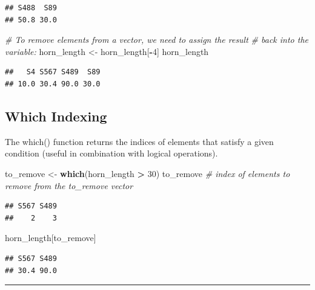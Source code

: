 \documentclass[
]{book}
\newenvironment{Shaded}{\begin{snugshade}}{\end{snugshade}}
\newcommand{\CommentTok}[1]{\textcolor[rgb]{0.56,0.35,0.01}{\textit{#1}}}
\newcommand{\DecValTok}[1]{\textcolor[rgb]{0.00,0.00,0.81}{#1}}
\newcommand{\FunctionTok}[1]{\textcolor[rgb]{0.13,0.29,0.53}{\textbf{#1}}}
\newcommand{\NormalTok}[1]{#1}
\newcommand{\OtherTok}[1]{\textcolor[rgb]{0.56,0.35,0.01}{#1}}
\newcommand{\SpecialCharTok}[1]{\textcolor[rgb]{0.81,0.36,0.00}{\textbf{#1}}}
\begin{document}
\begin{verbatim}
## S488  S89 
## 50.8 30.0
\end{verbatim}

\begin{Shaded}
\begin{Highlighting}[]
\CommentTok{\# To remove elements from a vector, we need to assign the result }
\CommentTok{\# back into the variable:}
\NormalTok{horn\_length }\OtherTok{\textless{}{-}}\NormalTok{ horn\_length[}\SpecialCharTok{{-}}\DecValTok{4}\NormalTok{]}
\NormalTok{horn\_length}
\end{Highlighting}
\end{Shaded}

\begin{verbatim}
##   S4 S567 S489  S89 
## 10.0 30.4 90.0 30.0
\end{verbatim}

\subsection{Which Indexing}\label{which-indexing}

The which() function returns the indices of elements that satisfy a given condition (useful in combination with logical operations).

\begin{Shaded}
\begin{Highlighting}[]
\NormalTok{to\_remove }\OtherTok{\textless{}{-}} \FunctionTok{which}\NormalTok{(horn\_length }\SpecialCharTok{\textgreater{}} \DecValTok{30}\NormalTok{)}
\NormalTok{to\_remove }\CommentTok{\# index of elements to remove from the to\_remove vector}
\end{Highlighting}
\end{Shaded}

\begin{verbatim}
## S567 S489 
##    2    3
\end{verbatim}

\begin{Shaded}
\begin{Highlighting}[]
\NormalTok{horn\_length[to\_remove]}
\end{Highlighting}
\end{Shaded}

\begin{verbatim}
## S567 S489 
## 30.4 90.0
\end{verbatim}

\begin{center}\rule{0.5\linewidth}{0.5pt}\end{center}
\end{document}
